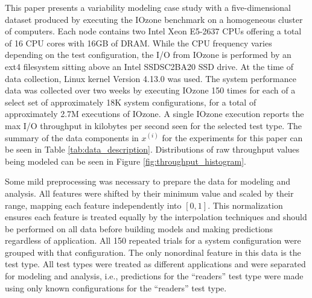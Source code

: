 \documentclass[smallextended]{svjour3}       %
\begin{document}
This paper presents a variability modeling case study with a five-dimensional dataset produced by executing the IOzone benchmark \cite{iozone} on a homogeneous cluster of computers. Each node contains two Intel Xeon E5-2637 CPUs offering a total of 16 CPU cores with 16GB of DRAM. While the CPU frequency varies depending on the test configuration, the I/O from IOzone is performed by an ext4 filesystem sitting above an Intel SSDSC2BA20 SSD drive. At the time of data collection, Linux kernel Version 4.13.0 was used. The system performance data was collected over two weeks by executing IOzone 150 times for each of a select set of approximately 18K system configurations, for a total of approximately 2.7M executions of IOzone. A single IOzone execution reports the max I/O throughput in kilobytes per second seen for the selected test type. The summary of the data components in $x^{(i)}$ for the experiments for this paper can be seen in Table \ref{tab:data_description}. Distributions of raw throughput values being modeled can be seen in Figure \ref{fig:throughput_histogram}.

Some mild preprocessing was necessary to prepare the data for modeling and analysis. All features were shifted by their minimum value and scaled by their range, mapping each feature independently into $[0,1]$. This normalization ensures each feature is treated equally by the interpolation techniques and should be performed on all data before building models and making predictions regardless of application. All 150 repeated trials for a system configuration were grouped with that configuration. The only nonordinal feature in this data is the test type. All test types were treated as different applications and were separated for modeling and analysis, i.e., predictions for the ``readers'' test type were made using only known configurations for the ``readers'' test type.

\end{document}
